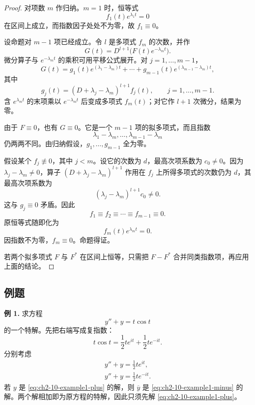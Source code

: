\begin{proof}
对项数 \(m\) 作归纳。\(m=1\) 时，恒等式
\[
 f_1(t)e^{\lambda_1t}=0
\]
在区间上成立，而指数因子处处不为零，故 \(f_1\equiv0\)。

设命题对 \(m-1\) 项已经成立。令 \(l\) 是多项式 \(f_m\) 的次数，并作
\begin{equation}
 G(t)=D^{l+1}\bigl(F(t)e^{-\lambda_mt}\bigr).
 \label{eq:ch2-10-annihilator}
\end{equation}
微分算子与 \(e^{-\lambda_mt}\) 的乘积可用平移公式展开。对 \(j=1,\ldots,m-1\)，
\begin{equation}
 G(t)=g_1(t)e^{(\lambda_1-\lambda_m)t}
       +\cdots+g_{m-1}(t)e^{(\lambda_{m-1}-\lambda_m)t},
 \label{eq:ch2-10-reduced-quasipolynomial}
\end{equation}
其中
\begin{equation}
 g_j(t)=(D+\lambda_j-\lambda_m)^{l+1}f_j(t),
 \qquad j=1,\ldots,m-1.
 \label{eq:ch2-10-gj}
\end{equation}
含 \(e^{\lambda_mt}\) 的末项乘以 \(e^{-\lambda_mt}\) 后变成多项式 \(f_m(t)\)；对它作 \(l+1\) 次微分，结果为零。

由于 \(F\equiv0\)，也有 \(G\equiv0\)。它是一个 \(m-1\) 项的拟多项式，而且指数
\[
 \lambda_1-\lambda_m,\ldots,\lambda_{m-1}-\lambda_m
\]
仍两两不同。由归纳假设，\(g_1,\ldots,g_{m-1}\) 全为零。

假设某个 \(f_j\not\equiv0\)，其中 \(j<m\)。设它的次数为 \(d\)，最高次项系数为 \(c_0\ne0\)。因为
\(\lambda_j-\lambda_m\ne0\)，算子 \((D+\lambda_j-\lambda_m)^{l+1}\) 作用在 \(f_j\) 上所得多项式的次数仍为 \(d\)，其最高次项系数为
\[
 (\lambda_j-\lambda_m)^{l+1}c_0\ne0.
\]
这与 \(g_j\equiv0\) 矛盾。因此
\[
 f_1\equiv f_2\equiv\cdots\equiv f_{m-1}\equiv0.
\]
原恒等式随即化为
\[
 f_m(t)e^{\lambda_mt}=0.
\]
因指数不为零，\(f_m\equiv0\)。命题得证。

若两个拟多项式 \(F\) 与 \(F^*\) 在区间上恒等，只需把 \(F-F^*\) 合并同类指数项，再应用上面的结论。
\end{proof}

\subsection*{例题}

\noindent\textbf{例 1.}
求方程
\begin{equation}
 y''+y=t\cos t
 \label{eq:ch2-10-example1}
\end{equation}
的一个特解。先把右端写成复指数：
\begin{equation}
 t\cos t=\frac12te^{it}+\frac12te^{-it}.
 \label{eq:ch2-10-example1-complex-force}
\end{equation}
分别考虑
\begin{gather}
 y''+y=\frac12te^{it},
 \label{eq:ch2-10-example1-plus}\\
 y''+y=\frac12te^{-it}.
 \label{eq:ch2-10-example1-minus}
\end{gather}
若 \(y\) 是 \eqref{eq:ch2-10-example1-plus} 的解，则 \(\overline y\) 是 \eqref{eq:ch2-10-example1-minus} 的解。两个解相加即为原方程的特解，因此只须先解 \eqref{eq:ch2-10-example1-plus}。

